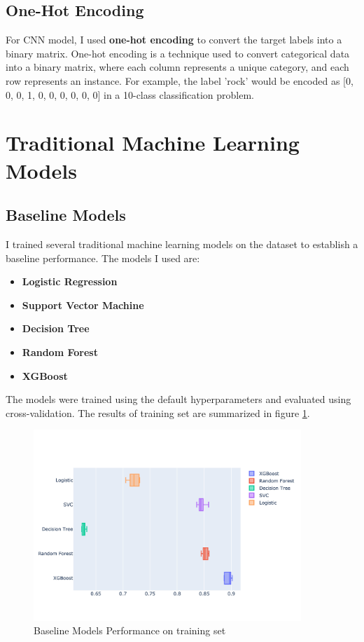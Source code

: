 \documentclass[11.5pt]{article}
\begin{document}
\subsection{One-Hot Encoding}
For CNN model, I used \textbf{one-hot encoding} to convert the target labels into a binary matrix. One-hot encoding is a technique used to convert categorical data into a binary matrix, where each column represents a unique category, and each row represents an instance. For example, the label 'rock' would be encoded as [0, 0, 0, 1, 0, 0, 0, 0, 0, 0] in a 10-class classification problem.

\pagebreak
\section{Traditional Machine Learning Models} \label{sec:traditional_ml}
\subsection{Baseline Models}
I trained several traditional machine learning models on the dataset to establish a baseline performance. The models I used are:
\begin{itemize}
    \item \textbf{Logistic Regression}
    \item \textbf{Support Vector Machine}
    \item \textbf{Decision Tree}
    \item \textbf{Random Forest}
    \item \textbf{XGBoost}
\end{itemize}
The models were trained using the default hyperparameters and evaluated using cross-validation. The results of training set are summarized in figure \ref{fig:baseline_models}.
\begin{figure}[H]
    \centering
    \includegraphics[width=0.9\textwidth]{graphics/baseline_models.jpg}
    \caption{Baseline Models Performance on training set}
    \label{fig:baseline_models}
\end{figure}
\end{document}
